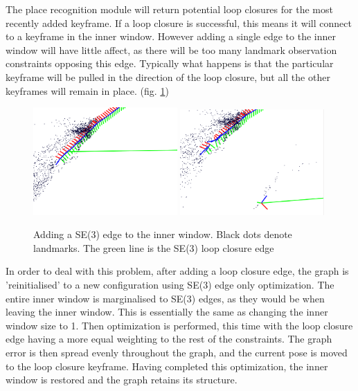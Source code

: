 The place recognition module will return potential loop closures for the most recently added keyframe.  If a loop closure is successful, this means it will connect to a keyframe in the inner window.  However adding a single edge to the inner window will have little affect, as there will be too many landmark observation constraints opposing this edge.  Typically what happens is that the particular keyframe will be pulled in the direction of the loop closure, but all the other keyframes will remain in place. (fig. \ref{fig:graph_fail})

\begin{figure}[h]
  \centering
    \includegraphics[width=0.49\textwidth]{chapters/images/before_opt}
    \includegraphics[width=0.49\textwidth]{chapters/images/after_opt}
  \caption{Adding a SE(3) edge to the inner window.  Black dots denote landmarks.  The green line is the SE(3) loop closure edge}
  \label{fig:graph_fail}
\end{figure}

In order to deal with this problem, after adding a loop closure edge, the graph is 'reinitialised' to a new configuration using SE(3) edge only optimization.  The entire inner window is marginalised to SE(3) edges, as they would be when leaving the inner window.  This is essentially the same as changing the inner window size to 1.  Then optimization is performed, this time with the loop closure edge having a more equal weighting to the rest of the constraints.  The graph error is then spread evenly throughout the graph, and the current pose is moved to the loop closure keyframe.  Having completed this optimization, the inner window is restored and the graph retains its structure.

